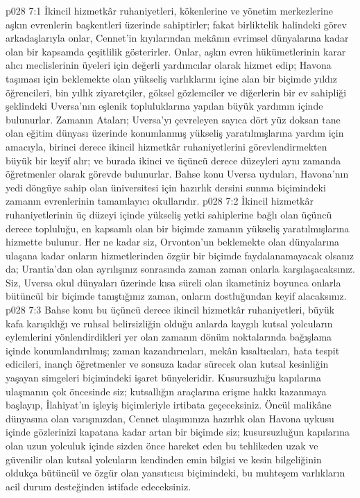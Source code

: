 \vs p028 7:1 İkincil hizmetkâr ruhaniyetleri, kökenlerine ve yönetim merkezlerine aşkın evrenlerin başkentleri üzerinde sahiptirler; fakat birliktelik halindeki görev arkadaşlarıyla onlar, Cennet’in kıyılarından mekânın evrimsel dünyalarına kadar olan bir kapsamda çeşitlilik gösterirler. Onlar, aşkın evren hükümetlerinin karar alıcı meclislerinin üyeleri için değerli yardımcılar olarak hizmet edip; Havona taşıması için beklemekte olan yükseliş varlıklarını içine alan bir biçimde yıldız öğrencileri, bin yıllık ziyaretçiler, göksel gözlemciler ve diğerlerin bir ev sahipliği şeklindeki Uversa’nın eşlenik topluluklarına yapılan büyük yardımın içinde bulunurlar. Zamanın Ataları; Uversa’yı çevreleyen sayıca dört yüz doksan tane olan eğitim dünyası üzerinde konumlanmış yükseliş yaratılmışlarına yardım için amacıyla, birinci derece ikincil hizmetkâr ruhaniyetlerini görevlendirmekten büyük bir keyif alır; ve burada ikinci ve üçüncü derece düzeyleri aynı zamanda öğretmenler olarak görevde bulunurlar. Bahse konu Uversa uyduları, Havona’nın yedi döngüye sahip olan üniversitesi için hazırlık dersini sunma biçimindeki zamanın evrenlerinin tamamlayıcı okullarıdır.
\vs p028 7:2 İkincil hizmetkâr ruhaniyetlerinin üç düzeyi içinde yükseliş yetki sahiplerine bağlı olan üçüncü derece topluluğu, en kapsamlı olan bir biçimde zamanın yükseliş yaratılmışlarına hizmette bulunur. Her ne kadar siz, Orvonton’un beklemekte olan dünyalarına ulaşana kadar onların hizmetlerinden özgür bir biçimde faydalanamayacak olsanız da; Urantia’dan olan ayrılışınız sonrasında zaman zaman onlarla karşılaşacaksınız. Siz, Uversa okul dünyaları üzerinde kısa süreli olan ikametiniz boyunca onlarla bütüncül bir biçimde tanıştığınız zaman, onların dostluğundan keyif alacaksınız.
\vs p028 7:3 Bahse konu bu üçüncü derece ikincil hizmetkâr ruhaniyetleri, büyük kafa karışıklığı ve ruhsal belirsizliğin olduğu anlarda kaygılı kutsal yolcuların eylemlerini yönlendirdikleri yer olan zamanın dönüm noktalarında bağışlama içinde konumlandırılmış; zaman kazandırıcıları, mekân kısaltıcıları, hata tespit edicileri, inançlı öğretmenler ve sonsuza kadar sürecek olan kutsal kesinliğin yaşayan simgeleri biçimindeki işaret bünyeleridir. Kusursuzluğu kapılarına ulaşmanın çok öncesinde siz; kutsallığın araçlarına erişme hakkı kazanmaya başlayıp, İlahiyat’ın işleyiş biçimleriyle irtibata geçeceksiniz. Öncül malikâne dünyasına olan varışınızdan, Cennet ulaşımınıza hazırlık olan Havona uykusu içinde gözlerinizi kapatana kadar artan bir biçimde siz; kusursuzluğun kapılarına olan uzun yolculuk içinde sizden önce hareket eden bu tehlikeden uzak ve güvenilir olan kutsal yolcuların kendinden emin bilgisi ve kesin bilgeliğinin oldukça bütüncül ve özgür olan yansıtıcısı biçimindeki, bu muhteşem varlıkların acil durum desteğinden istifade edeceksiniz.
